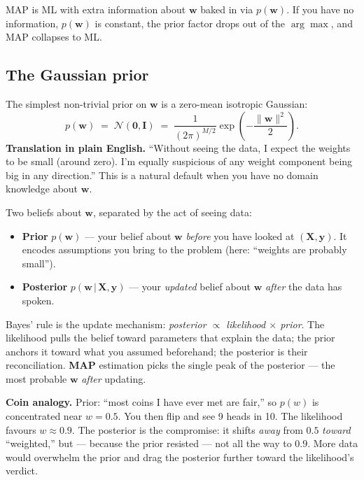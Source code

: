 \documentclass[11pt, a4paper]{article}
\begin{document}
MAP is ML with extra information about $\mathbf{w}$ baked in via $p(\mathbf{w})$. If you have no information, $p(\mathbf{w})$ is constant, the prior factor drops out of the $\arg\max$, and MAP collapses to ML.

\subsection{The Gaussian prior}

The simplest non-trivial prior on $\mathbf{w}$ is a zero-mean isotropic Gaussian:
\[
p(\mathbf{w}) \;=\; \mathcal{N}(\mathbf{0},\mathbf{I}) \;=\; \frac{1}{(2\pi)^{M/2}}\exp\!\left(-\frac{\|\mathbf{w}\|^2}{2}\right).
\]
\textbf{Translation in plain English.} ``Without seeing the data, I expect the weights to be small (around zero). I'm equally suspicious of any weight component being big in any direction.'' This is a natural default when you have no domain knowledge about $\mathbf{w}$.

\begin{notebox}
Two beliefs about $\mathbf{w}$, separated by the act of seeing data:
\begin{itemize}
  \item \textbf{Prior} $p(\mathbf{w})$ --- your belief about $\mathbf{w}$ \emph{before} you have looked at $(\mathbf{X},\mathbf{y})$. It encodes assumptions you bring to the problem (here: ``weights are probably small'').
  \item \textbf{Posterior} $p(\mathbf{w}\,|\,\mathbf{X},\mathbf{y})$ --- your \emph{updated} belief about $\mathbf{w}$ \emph{after} the data has spoken.
\end{itemize}
Bayes' rule is the update mechanism: \emph{posterior $\propto$ likelihood $\times$ prior}. The likelihood pulls the belief toward parameters that explain the data; the prior anchors it toward what you assumed beforehand; the posterior is their reconciliation. \textbf{MAP} estimation picks the single peak of the posterior --- the most probable $\mathbf{w}$ \emph{after} updating.

\textbf{Coin analogy.} Prior: ``most coins I have ever met are fair,'' so $p(w)$ is concentrated near $w=0.5$. You then flip and see 9 heads in 10. The likelihood favours $w\approx0.9$. The posterior is the compromise: it shifts \emph{away} from $0.5$ \emph{toward} ``weighted,'' but --- because the prior resisted --- not all the way to $0.9$. More data would overwhelm the prior and drag the posterior further toward the likelihood's verdict.
\end{notebox}
\end{document}
